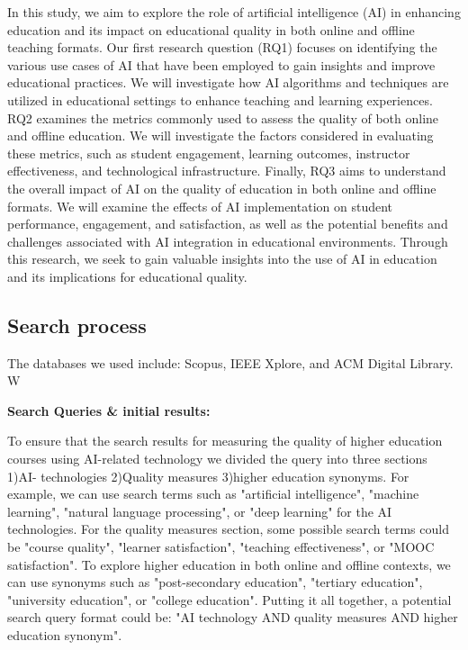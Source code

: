 In this study, we aim to explore the role of artificial intelligence (AI) in enhancing education and its impact on educational quality in both online and offline teaching formats. Our first research question (RQ1) focuses on identifying the various use cases of AI that have been employed to gain insights and improve educational practices. We will investigate how AI algorithms and techniques are utilized in educational settings to enhance teaching and learning experiences. RQ2 examines the metrics commonly used to assess the quality of both online and offline education. We will investigate the factors considered in evaluating these metrics, such as student engagement, learning outcomes, instructor effectiveness, and technological infrastructure. Finally, RQ3 aims to understand the overall impact of AI on the quality of education in both online and offline formats. We will examine the effects of AI implementation on student performance, engagement, and satisfaction, as well as the potential benefits and challenges associated with AI integration in educational environments. Through this research, we seek to gain valuable insights into the use of AI in education and its implications for educational quality.


\subsection{Search process}
\label{searchStrategy}
 The databases we used include: Scopus, IEEE Xplore, and ACM Digital Library. W



\textbf{ Search Queries \& initial results:}

To ensure that the search results for measuring the quality of higher education courses using AI-related technology we divided the query into three sections 1)AI- technologies 2)Quality measures 3)higher education synonyms. For example, we can use search terms such as "artificial intelligence", "machine learning", "natural language processing", or "deep learning" for the AI technologies.
For the quality measures section, some possible search terms could be "course quality", "learner satisfaction", "teaching effectiveness", or "MOOC satisfaction".
To explore higher education in both online and offline contexts, we can use synonyms such as "post-secondary education", "tertiary education", "university education", or "college education".
Putting it all together, a potential search query format could be: "AI technology AND quality measures AND higher education synonym".

